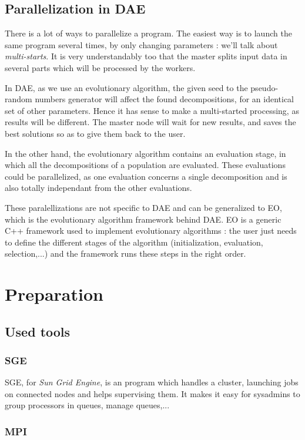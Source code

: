 \documentclass{report}
\begin{document}
\section{Parallelization in DAE}
There is a lot of ways to parallelize a program. The easiest way is to launch the same program several times, by only
changing parameters : we'll talk about \textit{multi-starts}. It is very understandably too that the master splits input data in
several parts which will be processed by the workers.
\

In DAE, as we use an evolutionary algorithm, the given seed to the pseudo-random numbers generator will affect the found
decompositions, for an identical set of other parameters. Hence it has sense to make a multi-started processing, as
results will be different. The master node will wait for new results, and saves the best solutions so as to give them back
to the user.
\

In the other hand, the evolutionary algorithm contains an evaluation stage, in which all the decompositions of a
population are evaluated. These evaluations could be parallelized, as one evaluation concerns a single decomposition and
is also totally independant from the other evaluations.

These paralellizations are not specific to DAE and can be generalized to EO, which is the evolutionary algorithm
framework behind DAE. EO is a generic C++ framework used to implement evolutionary algorithms : the user just needs to
define the different stages of the algorithm (initialization, evaluation, selection,...) and the framework runs these steps in the
right order.

\chapter{Preparation}
\section{Used tools}
\subsection{SGE}
SGE, for \textit{Sun Grid Engine}, is an program which handles a cluster, launching jobs on connected nodes and helps
supervising them. It makes it easy for sysadmins to group processors in queues, manage queues,...

\subsection{MPI}
\end{document}
